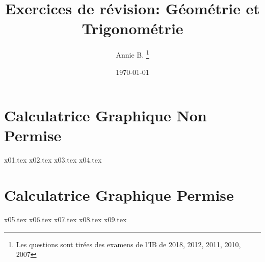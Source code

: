 \documentclass[10pt]{article}
\newcounter{question}
\begin{document}

\title{Exercices de révision: Géométrie et Trigonométrie}
\author{Annie B. \thanks{Les questions sont tirées des examens de l’IB de 2018, 2012, 2011, 2010, 2007}}
\date{\today}
\maketitle

\newpage
\section*{\textbf{Calculatrice Graphique Non Permise}}
{x01.tex}
\bigskip
{x02.tex}
\newpage
{x03.tex}
\bigskip
{x04.tex}
\newpage
\section*{\textbf{Calculatrice Graphique Permise}}
{x05.tex}
\bigskip
{x06.tex}
\newpage
{x07.tex}
\bigskip
{x08.tex}
\newpage
{x09.tex}
\end{document}
